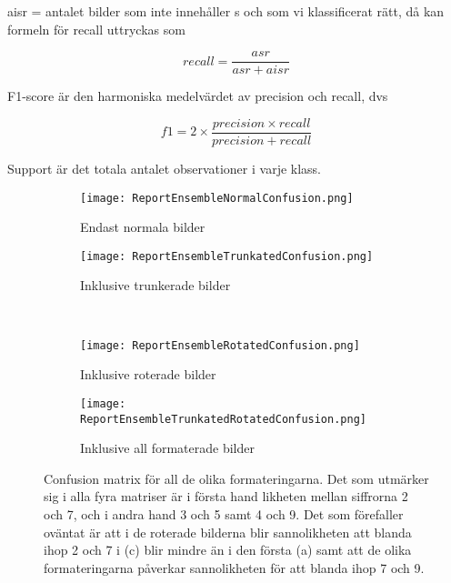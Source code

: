 \documentclass[12pt,a4paper]{article}
\begin{document}
\noindent
aisr = antalet bilder som inte innehåller s och som vi klassificerat rätt, då kan formeln för recall uttryckas som

\[ recall = \frac{asr}{asr + aisr} \]

F1-score är den harmoniska medelvärdet av precision och recall, dvs

\[f1 = 2 \times\frac{precision\times recall}{precision + recall} \]

Support är det totala antalet observationer i varje klass. 


\begin{figure}[t]
\footnotesize
    \label{Confusion matrix för all}
    \centering
    \begin{subfigure}[b]{0.45\textwidth}
        \texttt{[image: ReportEnsembleNormalConfusion.png]}
        \caption{Endast normala bilder}
        \label{confusion matrix normal}
    \end{subfigure}
    \quad
    \begin{subfigure}[b]{0.45\textwidth}
        \texttt{[image: ReportEnsembleTrunkatedConfusion.png]}
        \caption{Inklusive trunkerade bilder}
        \label{confusion matrix trunkerad}
    \end{subfigure}
    \\
    \begin{subfigure}[b]{0.45\textwidth}
        \texttt{[image: ReportEnsembleRotatedConfusion.png]}
        \caption{Inklusive roterade bilder}
        \label{confusion matrix roterad}
    \end{subfigure}
    \quad
    \begin{subfigure}[b]{0.45\textwidth}
        \texttt{[image: ReportEnsembleTrunkatedRotatedConfusion.png]}
        \caption{Inklusive all formaterade bilder}
        \label{confusion matrix roterad and trunkated}
    \end{subfigure}
        \caption{\footnotesize{Confusion matrix för all de olika formateringarna. Det som utmärker sig i alla fyra matriser är i första hand likheten mellan siffrorna 2 och 7, och i andra hand 3 och 5 samt 4 och 9. Det som förefaller oväntat är att i de roterade bilderna blir sannolikheten att blanda ihop 2 och 7 i (c) blir mindre än i den första (a) samt att de olika formateringarna påverkar sannolikheten för att blanda ihop 7 och 9.}}
\end{figure}
\end{document}
